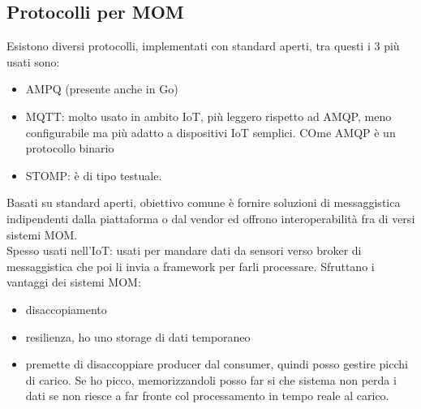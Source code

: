 \documentclass[16px]{article}
\begin{document}
\subsection{Protocolli per MOM}
Esistono diversi protocolli, implementati con standard aperti, tra questi i 3 più usati sono:
\begin{itemize}
\item AMPQ (presente anche in Go)
\item MQTT: molto usato in ambito IoT, più leggero rispetto ad AMQP, meno configurabile ma più adatto a dispositivi IoT semplici. COme AMQP è un protocollo binario
\item STOMP: è di tipo testuale.
\end{itemize}
Basati su standard aperti, obiettivo comune è fornire soluzioni di messaggistica indipendenti dalla piattaforma o dal vendor ed offrono interoperabilità fra di versi sistemi MOM.\\ Spesso usati nell'IoT: usati per mandare dati da sensori verso broker di messaggistica che poi li invia a framework per farli processare. Sfruttano i vantaggi dei sistemi MOM:
\begin{itemize}
\item disaccopiamento
\item resilienza, ho uno storage di dati temporaneo
\item premette di disaccoppiare producer dal consumer, quindi posso gestire picchi di carico. Se ho picco, memorizzandoli posso far si che sistema non perda i dati se non riesce a far fronte col processamento in tempo reale al carico.
\end{itemize}
\end{document}
